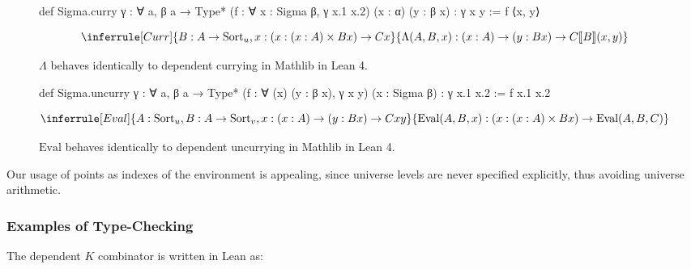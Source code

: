 \documentclass{article}
\newcommand{\llb}{\llbracket}
\newcommand{\rrb}{\rrbracket}
\newcommand{\arr}{\rightarrow}
\newcommand{\sort}[1]{\text{Sort}_{#1}}
\begin{document}
\begin{figure}
  \begin{minipage}{0.45\textwidth}
\begin{leancode}
def Sigma.curry {γ : ∀ a, β a → Type*} (f : ∀ x : Sigma β, γ x.1 x.2) (x : α) (y : β x) : γ x y :=
  f ⟨x, y⟩
\end{leancode}
    \end{minipage}
    \begin{minipage}{0.45\textwidth}
      \begin{equation}
        \inferrule[Curr]
        {B : A \arr \sort{u}, x : (x : (x : A) \times B x) \arr C x}
        {\Lambda (A, B, x) : (x : A) \arr (y : B x) \arr C \llb B \rrb (x, y)}
      \end{equation}
    \end{minipage}
\caption{\label{isocurry}\(\Lambda\) behaves identically to dependent currying in Mathlib in Lean 4.}
\end{figure}

\begin{figure}
  \begin{minipage}{0.45\textwidth}
\begin{leancode}
def Sigma.uncurry {γ : ∀ a, β a → Type*} (f : ∀ (x) (y : β x), γ x y) (x : Sigma β) : γ x.1 x.2 :=
  f x.1 x.2
\end{leancode}
    \end{minipage}
    \begin{minipage}{0.45\textwidth}
      \begin{equation}
        \inferrule[Eval]
        {A : \sort{u}, B : A \arr \sort{v}, x : (x : A) \arr (y : B x) \arr C x y}
        {\text{Eval}(A, B, x) : (x : (x : A) \times B x) \arr \text{Eval}(A, B, C)}
      \end{equation}
    \end{minipage}
\caption{\label{isoeval}\(\text{Eval}\) behaves identically to dependent uncurrying in Mathlib in Lean 4.}
\end{figure}

Our usage of points as indexes of the environment is appealing, since universe levels are never specified explicitly, thus avoiding universe arithmetic.

\subsubsection{Examples of Type-Checking}

The dependent \(K\) combinator is written in Lean as:
\end{document}
